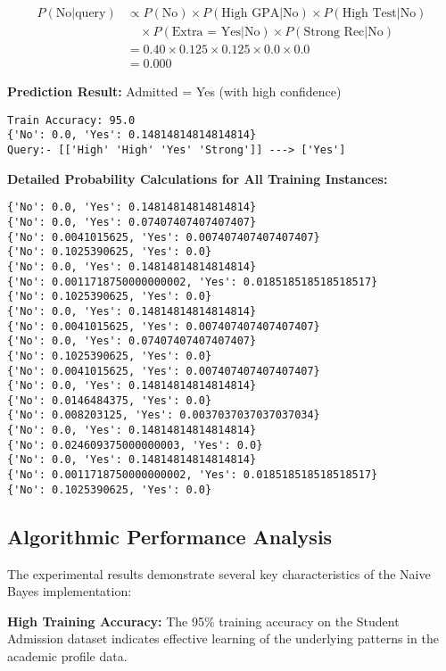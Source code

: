 \documentclass[11pt,a4paper]{article}
\begin{document}
\begin{align}
P(\text{No}|\text{query}) &\propto P(\text{No}) \times P(\text{High GPA}|\text{No}) \times P(\text{High Test}|\text{No}) \\
&\quad \times P(\text{Extra = Yes}|\text{No}) \times P(\text{Strong Rec}|\text{No}) \\
&= 0.40 \times 0.125 \times 0.125 \times 0.0 \times 0.0 \\
&= 0.000
\end{align}

\textbf{Prediction Result:} Admitted = Yes (with high confidence)

\begin{lstlisting}[caption=Complete Training and Prediction Output]
Train Accuracy: 95.0
{'No': 0.0, 'Yes': 0.14814814814814814}
Query:- [['High' 'High' 'Yes' 'Strong']] ---> ['Yes']
\end{lstlisting}

\textbf{Detailed Probability Calculations for All Training Instances:}

\begin{lstlisting}[caption=Posterior Probabilities for Each Training Instance]
{'No': 0.0, 'Yes': 0.14814814814814814}
{'No': 0.0, 'Yes': 0.07407407407407407}
{'No': 0.0041015625, 'Yes': 0.007407407407407407}
{'No': 0.1025390625, 'Yes': 0.0}
{'No': 0.0, 'Yes': 0.14814814814814814}
{'No': 0.0011718750000000002, 'Yes': 0.018518518518518517}
{'No': 0.1025390625, 'Yes': 0.0}
{'No': 0.0, 'Yes': 0.14814814814814814}
{'No': 0.0041015625, 'Yes': 0.007407407407407407}
{'No': 0.0, 'Yes': 0.07407407407407407}
{'No': 0.1025390625, 'Yes': 0.0}
{'No': 0.0041015625, 'Yes': 0.007407407407407407}
{'No': 0.0, 'Yes': 0.14814814814814814}
{'No': 0.0146484375, 'Yes': 0.0}
{'No': 0.008203125, 'Yes': 0.0037037037037037034}
{'No': 0.0, 'Yes': 0.14814814814814814}
{'No': 0.024609375000000003, 'Yes': 0.0}
{'No': 0.0, 'Yes': 0.14814814814814814}
{'No': 0.0011718750000000002, 'Yes': 0.018518518518518517}
{'No': 0.1025390625, 'Yes': 0.0}
\end{lstlisting}

\subsection{Algorithmic Performance Analysis}

The experimental results demonstrate several key characteristics of the Naive Bayes implementation:

\textbf{High Training Accuracy:} The 95\% training accuracy on the Student Admission dataset indicates effective learning of the underlying patterns in the academic profile data.
\end{document}
